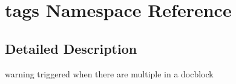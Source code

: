 \hypertarget{namespacetags}{\section{tags \-Namespace \-Reference}
\label{namespacetags}
}


\subsection{\-Detailed \-Description}
warning triggered when there are multiple in a docblock 